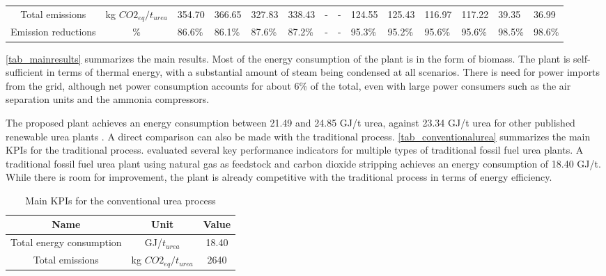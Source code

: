 \documentclass[a4paper, titlepage]{article}
\begin{document}
\begin{table}
\begin{tabular}{|| c | c | C{0.8cm} | C{0.8cm} | C{0.8cm} | C{0.8cm}| C{0.8cm} | C{0.8cm} |  C{0.8cm} | C{0.8cm}| C{0.8cm} | C{0.8cm} | C{0.8cm} |  C{0.8cm} ||}
		Total emissions & kg $CO2_{eq}/t_{urea}$ & 354.70 & 366.65 & 327.83 & 338.43 & - & - & 124.55 & 125.43 & 116.97 & 117.22 & 39.35 & 36.99 \\

		Emission reductions\footnotemark[1] & \% & 86.6\% & 86.1\% & 87.6\% & 87.2\% & - & - & 95.3\% & 95.2\% & 95.6\% & 95.6\% & 98.5\% & 98.6\% \\
	\hline
	\end{tabular}

\end{table}

\autoref{tab_mainresults} summarizes the main results. Most of the energy consumption of the plant is in the form of
biomass. The plant is self-sufficient in terms of thermal energy, with a substantial amount of steam being condensed 
at all scenarios.
There is need for power imports from the grid, although net power consumption accounts for about 6\% of the total,
even with large power consumers such as the air separation units and the ammonia compressors. 

The proposed plant achieves an energy consumption between 21.49 and 24.85 GJ/t urea, against 23.34 GJ/t urea for
other published renewable urea plants \cite{zhangTechnoeconomicComparison1002021}. A direct comparison can also be 
made with the traditional process. \autoref{tab_conventionalurea} summarizes the main KPIs for the traditional process.
\textcite{chenPerformanceComparisonUrea2022} evaluated several key performance indicators for multiple types of
traditional fossil fuel urea plants. A traditional fossil fuel urea plant using natural gas as feedstock and 
carbon dioxide stripping achieves an energy consumption of 18.40 GJ/t. While there is room for improvement, 
the plant is already competitive with the traditional process in terms of energy efficiency.

\begin{table}
	\centering
	\caption{Main KPIs for the conventional urea process}
	\label{tab_conventionalurea}
	\begin{tabular}{|| c | c | c||}
		\hline
		Name & Unit & Value \\
		\hline
		Total energy consumption & GJ/$t_{urea}$ & 18.40 \\
		Total emissions & kg $CO2_{eq}/t_{urea}$ & 2640 \\
		\hline
	\end{tabular}
\end{table}
\end{document}
